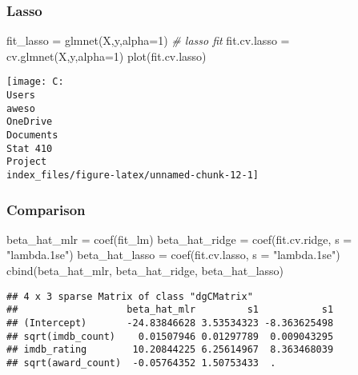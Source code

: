 \documentclass[
]{article}
\newenvironment{Shaded}{\begin{snugshade}}{\end{snugshade}}
\newcommand{\AttributeTok}[1]{\textcolor[rgb]{0.77,0.63,0.00}{#1}}
\newcommand{\CommentTok}[1]{\textcolor[rgb]{0.56,0.35,0.01}{\textit{#1}}}
\newcommand{\DecValTok}[1]{\textcolor[rgb]{0.00,0.00,0.81}{#1}}
\newcommand{\FunctionTok}[1]{\textcolor[rgb]{0.00,0.00,0.00}{#1}}
\newcommand{\NormalTok}[1]{#1}
\newcommand{\OtherTok}[1]{\textcolor[rgb]{0.56,0.35,0.01}{#1}}
\newcommand{\StringTok}[1]{\textcolor[rgb]{0.31,0.60,0.02}{#1}}
\begin{document}
\hypertarget{lasso}{%
\subsubsection{Lasso}\label{lasso}}

\begin{Shaded}
\begin{Highlighting}[]
\NormalTok{fit\_lasso }\OtherTok{=} \FunctionTok{glmnet}\NormalTok{(X,y,}\AttributeTok{alpha=}\DecValTok{1}\NormalTok{) }\CommentTok{\# lasso fit}
\NormalTok{fit.cv.lasso }\OtherTok{=} \FunctionTok{cv.glmnet}\NormalTok{(X,y,}\AttributeTok{alpha=}\DecValTok{1}\NormalTok{)}
\FunctionTok{plot}\NormalTok{(fit.cv.lasso)}
\end{Highlighting}
\end{Shaded}

\texttt{[image: C:\\Users\\aweso\\OneDrive\\Documents\\Stat 410\\Project\\index\_files/figure-latex/unnamed-chunk-12-1]}

\hypertarget{comparison}{%
\subsubsection{Comparison}\label{comparison}}

\begin{Shaded}
\begin{Highlighting}[]
\NormalTok{beta\_hat\_mlr }\OtherTok{=} \FunctionTok{coef}\NormalTok{(fit\_lm)}
\NormalTok{beta\_hat\_ridge }\OtherTok{=} \FunctionTok{coef}\NormalTok{(fit.cv.ridge, }\AttributeTok{s =} \StringTok{"lambda.1se"}\NormalTok{)}
\NormalTok{beta\_hat\_lasso }\OtherTok{=} \FunctionTok{coef}\NormalTok{(fit.cv.lasso, }\AttributeTok{s =} \StringTok{"lambda.1se"}\NormalTok{)}
\FunctionTok{cbind}\NormalTok{(beta\_hat\_mlr, beta\_hat\_ridge, beta\_hat\_lasso)}
\end{Highlighting}
\end{Shaded}

\begin{verbatim}
## 4 x 3 sparse Matrix of class "dgCMatrix"
##                   beta_hat_mlr         s1           s1
## (Intercept)       -24.83846628 3.53534323 -8.363625498
## sqrt(imdb_count)    0.01507946 0.01297789  0.009043295
## imdb_rating        10.20844225 6.25614967  8.363468039
## sqrt(award_count)  -0.05764352 1.50753433  .
\end{verbatim}
\end{document}
